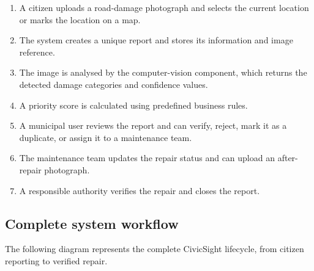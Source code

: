 \documentclass[11pt,a4paper]{article}
\begin{document}
\begin{enumerate}[leftmargin=0.6cm]

    \item A citizen uploads a road-damage photograph and selects the current location or marks the location on a map.

    \item The system creates a unique report and stores its information and image reference.

    \item The image is analysed by the computer-vision component, which returns the detected damage categories and confidence values.

    \item A priority score is calculated using predefined business rules.

    \item A municipal user reviews the report and can verify, reject, mark it as a duplicate, or assign it to a maintenance team.

    \item The maintenance team updates the repair status and can upload an after-repair photograph.

    \item A responsible authority verifies the repair and closes the report.

\end{enumerate}


\subsection{Complete system workflow}

The following diagram represents the complete CivicSight lifecycle, from citizen reporting to verified repair.
\end{document}
